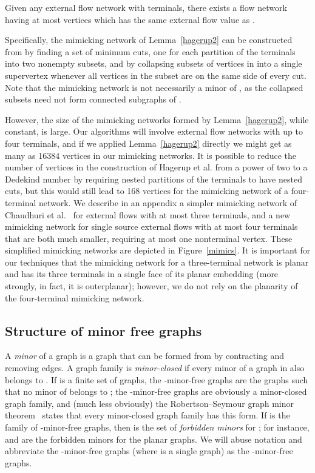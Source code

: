 \documentclass[runningheads]{llncs}
\begin{document}
\begin{lemma} \cite{ hknr-cmfnc-98} \label{hagerup2}
Given any external flow network  with  terminals, there exists a flow network having at most  vertices which has the same external flow value as .
\end{lemma}

Specifically, the mimicking network of Lemma~\ref{hagerup2} can be constructed from  by finding a set of  minimum cuts, one for each partition of the terminals into two nonempty subsets, and by collapsing subsets of vertices in  into a single supervertex whenever all vertices in the subset are on the same side of every cut. Note that the mimicking network is not necessarily a minor of , as the collapsed subsets need not form connected subgraphs of .

However, the size of the mimicking networks formed by Lemma~\ref{hagerup2}, while constant, is large. Our algorithms will involve external flow networks with up to four terminals, and if we applied Lemma~\ref{hagerup2} directly we might get as many as 16384 vertices in our mimicking networks. 
It is possible to reduce the number of vertices in the construction of Hagerup et al. from a power of two to a Dedekind number by requiring nested partitions of the terminals to have nested cuts, but this would still lead to 168 vertices for the mimicking network of a four-terminal network.
We describe in an appendix a simpler mimicking network of Chaudhuri et al.~\cite{cswz-cmn-00}  for external flows with at most three terminals, and a new mimicking network for single source external flows with at most four terminals that are both much smaller, requiring at most one nonterminal vertex. These simplified mimicking networks are depicted in Figure~\ref{mimics}.
It is important for our techniques that the mimicking network for a three-terminal network is planar and has its three terminals in a single face of its planar embedding (more strongly, in fact, it is outerplanar); however, we do not rely on the planarity of the four-terminal mimicking network.

\subsection{Structure of minor free graphs}
 
A \emph{minor} of a graph  is a graph that can be formed from  by contracting and removing edges. A graph family  is \emph{minor-closed} if every minor of a graph in  also belongs to . If  is a finite set of graphs, the -minor-free graphs are the graphs  such that no minor of  belongs to ; the -minor-free graphs are obviously a minor-closed graph family, and (much less obviously) the Robertson--Seymour graph minor theorem~\cite{rs-gm20wc-04} states that every minor-closed graph family has this form. If  is the family of -minor-free graphs, then  is the set of \emph{forbidden minors} for ; for instance,  and  are the forbidden minors for the planar graphs. We will abuse notation and abbreviate the -minor-free graphs (where  is a single graph) as the -minor-free graphs.
\end{document}
